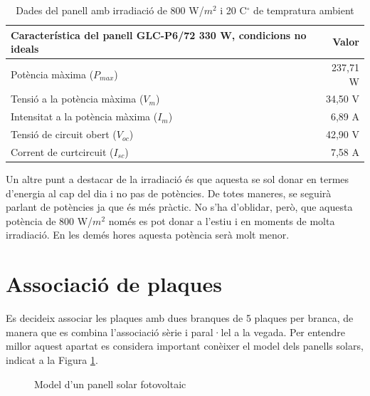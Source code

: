 \begin{table}[H]
\small
  \centering
    \begin{tabular} {|l|r|}
 \hline  
 \multicolumn{1}{|l|}{Característica del panell GLC-P6/72 330 W, condicions no ideals} &  \multicolumn{1}{r|}{Valor} \\ \hline \hline
	Potència màxima ($P_{max}$) & 237,71 W \\ \hline
	Tensió a la potència màxima ($V_m$) & 34,50 V \\ \hline
	Intensitat a la potència màxima ($I_m$) & 6,89 A \\ \hline
	Tensió de circuit obert ($V_{oc}$) & 42,90 V \\ \hline
	Corrent de curtcircuit ($I_{sc}$)& 7,58 A \\ \hline

    \end{tabular}%
    \caption{Dades del panell amb irradiació de 800 W/$m^2$ i 20 C$^\circ$ de tempratura ambient}
    \label{tab:panell_habitual}
\end{table}%

\noindent Un altre punt a destacar de la irradiació és que aquesta se sol donar en termes d'energia al cap del dia i no pas de potències. De totes maneres, se seguirà parlant de potències ja que és més pràctic. No s'ha d'oblidar, però, que aquesta potència de 800 W/$m^2$ només es pot donar a l'estiu i en moments de molta irradiació. En les demés hores aquesta potència serà molt menor.



\section{Associació de plaques} %
Es decideix associar les plaques amb dues branques de 5 plaques per branca, de manera que es combina l'associació sèrie i paral·lel a la vegada. Per entendre millor aquest apartat es considera important conèixer el model dels panells solars, indicat a la Figura \ref{fig:model}.
\begin{figure}[H]
\begin{center}
\end{center}
\caption{Model d'un panell solar fotovoltaic}
\label{fig:model}
\end{figure}

